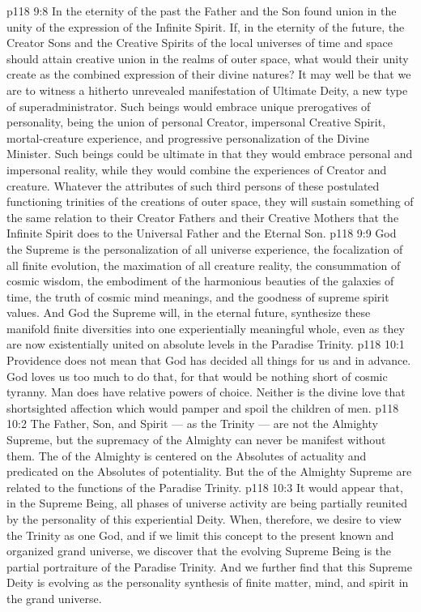 \vs p118 9:8 In the eternity of the past the Father and the Son found union in the unity of the expression of the Infinite Spirit. If, in the eternity of the future, the Creator Sons and the Creative Spirits of the local universes of time and space should attain creative union in the realms of outer space, what would their unity create as the combined expression of their divine natures? It may well be that we are to witness a hitherto unrevealed manifestation of Ultimate Deity, a new type of superadministrator. Such beings would embrace unique prerogatives of personality, being the union of personal Creator, impersonal Creative Spirit, mortal\hyp{}creature experience, and progressive personalization of the Divine Minister. Such beings could be ultimate in that they would embrace personal and impersonal reality, while they would combine the experiences of Creator and creature. Whatever the attributes of such third persons of these postulated functioning trinities of the creations of outer space, they will sustain something of the same relation to their Creator Fathers and their Creative Mothers that the Infinite Spirit does to the Universal Father and the Eternal Son.
\vs p118 9:9 \pc God the Supreme is the personalization of all universe experience, the focalization of all finite evolution, the maximation of all creature reality, the consummation of cosmic wisdom, the embodiment of the harmonious beauties of the galaxies of time, the truth of cosmic mind meanings, and the goodness of supreme spirit values. And God the Supreme will, in the eternal future, synthesize these manifold finite diversities into one experientially meaningful whole, even as they are now existentially united on absolute levels in the Paradise Trinity.
\vs p118 10:1 Providence does not mean that God has decided all things for us and in advance. God loves us too much to do that, for that would be nothing short of cosmic tyranny. Man does have relative powers of choice. Neither is the divine love that shortsighted affection which would pamper and spoil the children of men.
\vs p118 10:2 \pc The Father, Son, and Spirit --- as the Trinity --- are not the Almighty Supreme, but the supremacy of the Almighty can never be manifest without them. The  of the Almighty is centered on the Absolutes of actuality and predicated on the Absolutes of potentiality. But the  of the Almighty Supreme are related to the functions of the Paradise Trinity.
\vs p118 10:3 It would appear that, in the Supreme Being, all phases of universe activity are being partially reunited by the personality of this experiential Deity. When, therefore, we desire to view the Trinity as one God, and if we limit this concept to the present known and organized grand universe, we discover that the evolving Supreme Being is the partial portraiture of the Paradise Trinity. And we further find that this Supreme Deity is evolving as the personality synthesis of finite matter, mind, and spirit in the grand universe.
